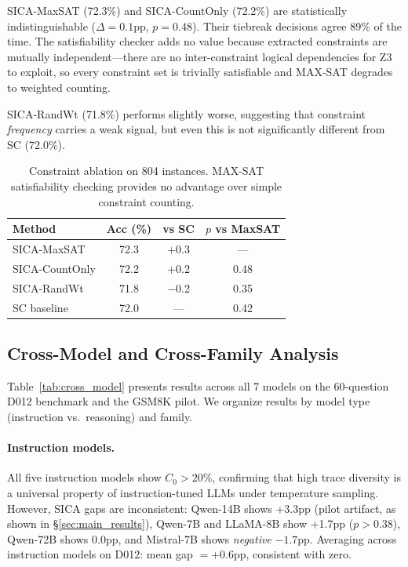 \documentclass[11pt,a4paper]{article}
\begin{document}
SICA-MaxSAT (72.3\%) and SICA-CountOnly (72.2\%) are statistically indistinguishable ($\Delta=0.1$pp, $p=0.48$).
Their tiebreak decisions agree 89\% of the time.
The satisfiability checker adds no value because extracted constraints are mutually independent---there are no inter-constraint logical dependencies for Z3 to exploit, so every constraint set is trivially satisfiable and MAX-SAT degrades to weighted counting.

SICA-RandWt (71.8\%) performs slightly worse, suggesting that constraint \emph{frequency} carries a weak signal, but even this is not significantly different from SC (72.0\%).

\begin{table}[t]
\centering
\small
\begin{tabular}{lccc}
\toprule
\textbf{Method} & \textbf{Acc (\%)} & \textbf{vs SC} & \textbf{$p$ vs MaxSAT} \\
\midrule
SICA-MaxSAT & 72.3 & +0.3 & --- \\
SICA-CountOnly & 72.2 & +0.2 & 0.48 \\
SICA-RandWt & 71.8 & $-$0.2 & 0.35 \\
SC baseline & 72.0 & --- & 0.42 \\
\bottomrule
\end{tabular}
\caption{Constraint ablation on 804 instances. MAX-SAT satisfiability checking provides no advantage over simple constraint counting.}
\label{tab:constraint_ablation}
\end{table}

\subsection{Cross-Model and Cross-Family Analysis}
\label{sec:cross_model}

Table~\ref{tab:cross_model} presents results across all 7 models on the 60-question D012 benchmark and the GSM8K pilot.
We organize results by model type (instruction vs.\ reasoning) and family.

\paragraph{Instruction models.}
All five instruction models show $C_0 > 20\%$, confirming that high trace diversity is a universal property of instruction-tuned LLMs under temperature sampling.
However, SICA gaps are inconsistent: Qwen-14B shows +3.3pp (pilot artifact, as shown in \S\ref{sec:main_results}), Qwen-7B and LLaMA-8B show +1.7pp ($p>0.38$), Qwen-72B shows 0.0pp, and Mistral-7B shows \emph{negative} $-1.7$pp.
Averaging across instruction models on D012: mean gap $= +0.6$pp, consistent with zero.
\end{document}
